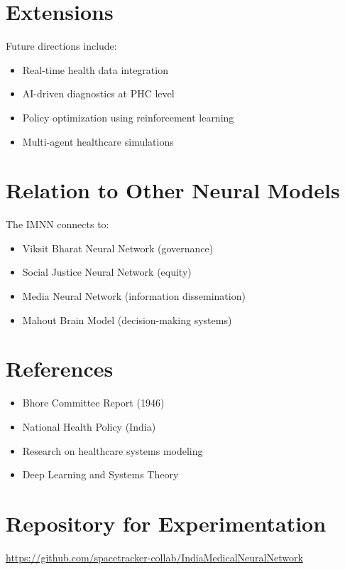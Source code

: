 \documentclass[12pt]{article}
\begin{document}
\section{Extensions}

Future directions include:

\begin{itemize}
\item Real-time health data integration
\item AI-driven diagnostics at PHC level
\item Policy optimization using reinforcement learning
\item Multi-agent healthcare simulations
\end{itemize}

\section{Relation to Other Neural Models}

The IMNN connects to:

\begin{itemize}
\item Viksit Bharat Neural Network (governance)
\item Social Justice Neural Network (equity)
\item Media Neural Network (information dissemination)
\item Mahout Brain Model (decision-making systems)
\end{itemize}

\section{References}

\begin{itemize}
\item Bhore Committee Report (1946)
\item National Health Policy (India)
\item Research on healthcare systems modeling
\item Deep Learning and Systems Theory
\end{itemize}

\section{Repository for Experimentation}

\noindent
\url{https://github.com/spacetracker-collab/IndiaMedicalNeuralNetwork}
\end{document}
